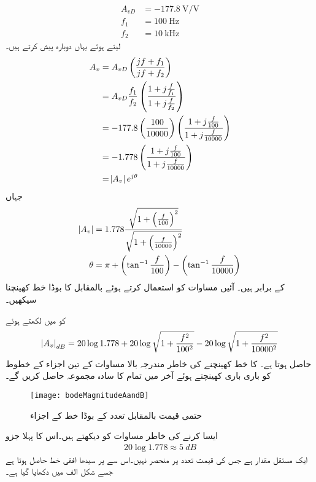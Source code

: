 \begin{align*}
A_{vD}&=\SI[per=frac,fraction=nice]{-177.8}{\volt \per \volt} \\
f_1&=\SI{100}{\hertz}\\
f_2&=\SI{10}{\kilo \hertz}
\end{align*}
  لیتے  ہوئے  یہاں دوبارہ پیش کرتے ہیں۔
\begin{align*}
A_v& =A_{vD} \left(\frac{j f +f_1}{j f +f_2} \right)\\
&=A_{vD} \frac{f_1}{f_2}\left(\frac{1+j\frac{f}{f_1}}{1 +j\frac{f}{f_2}} \right)\\
&=-177.8\left( \frac{100}{10000}\right) \left(\frac{1+j\frac{f}{100}}{1+j \frac{f}{10000}}\right)\\
&=-1.778 \left(\frac{1+j\frac{f}{100}}{1+j \frac{f}{10000}}\right)\\
&=\abs{A_{v}} e^{j \theta}
\end{align*}
جہاں
\begin{gather}
\begin{aligned} \label{مساوات_تعددی_ردعمل_بوڈا_جزو_مثال}
\abs{A_v}&=1.778  \frac{\sqrt{1+\left(\frac{f}{100} \right)^2}}{\sqrt{1+\left(\frac{f}{10000}\right)^2}} \\
\theta &=\pi+\left(\tan^{-1} \frac{f}{100} \right)-\left(\tan^{-1} \frac{f}{10000} \right)
\end{aligned}
\end{gather}
کے برابر ہیں۔ آئیں مساوات  کو استعمال کرتے ہوئے   بالمقابل  کا بوڈا خط کھینچنا سیکھیں۔

 کو  میں لکھتے ہوئے
\begin{align} \label{مساوات_تعددی_ردعمل_بوڈا_خط_حیطہ}
\abs{A_v}_{dB}=20 \log  1.778  +20 \log \sqrt{1+\frac{f^2}{100^2}} -20 \log \sqrt{1+\frac{f^2}{10000^2}} 
\end{align} 
حاصل ہوتا ہے۔ کا خط کھینچنے کی خاطر مندرجہ بالا مساوات کے تین اجزاء کے خطوط کو باری باری کھینچتے ہوئے آخر میں تمام کا سادہ مجموعہ حاصل کریں گے۔
\begin{figure}
\centering
\texttt{[image: bodeMagnitudeAandB]}
\caption{حتمی قیمت بالمقابل تعدد کے بوڈا خط کے اجزاء}
\label{شکل_تعددی_ردعمل_بوڈا_اجزاء_الف}
\end{figure}

ایسا کرنے کی خاطر مساوات  کو دیکھتے ہیں۔اس کا پہلا جزو
\begin{align*}
20 \log 1.778 \approx \SI{5}{dB}
\end{align*}
 ایک مستقل مقدار ہے جس کی قیمت تعدد پر منحصر نہیں۔اس  سے   پر سیدھا افقی خط  حاصل ہوتا ہے جسے شکل  الف میں دکھایا گیا ہے۔

